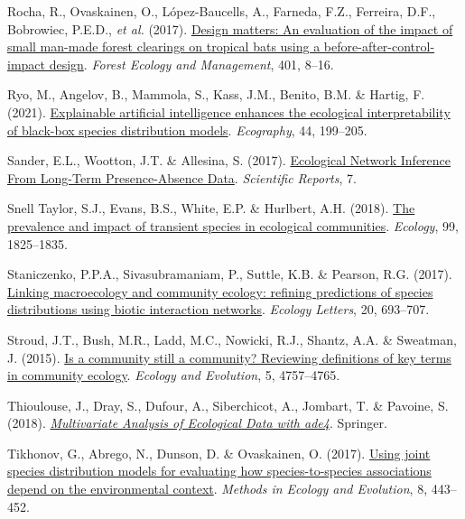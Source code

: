 \documentclass[9pt,biorxiv,doublespacing,lineno,endfloat]{lapreprint}
\newlength{\cslhangindent}
\newlength{\cslentryspacingunit} %
\newenvironment{CSLReferences}[2] %
 {%
  \setlength{\parindent}{0pt}
  \ifodd #1
  \let\oldpar\par
  \def\par{\hangindent=\cslhangindent\oldpar}
  \fi
  \setlength{\parskip}{#2\cslentryspacingunit}
 }%
 {}
\begin{document}
\begin{CSLReferences}{1}{0}
\leavevmode{}%
Rocha, R., Ovaskainen, O., López-Baucells, A., Farneda, F.Z., Ferreira,
D.F., Bobrowiec, P.E.D., \emph{et al.} (2017).
\href{https://doi.org/10.1016/j.foreco.2017.06.053}{Design matters: An
evaluation of the impact of small man-made forest clearings on tropical
bats using a before-after-control-impact design}. \emph{Forest Ecology
and Management}, 401, 8--16.

\leavevmode{}%
Ryo, M., Angelov, B., Mammola, S., Kass, J.M., Benito, B.M. \& Hartig,
F. (2021). \href{https://doi.org/10.1111/ecog.05360}{Explainable
artificial intelligence enhances the ecological interpretability of
black-box species distribution models}. \emph{Ecography}, 44, 199--205.

\leavevmode{}%
Sander, E.L., Wootton, J.T. \& Allesina, S. (2017).
\href{https://doi.org/10.1038/s41598-017-07009-x}{Ecological Network
Inference From Long-Term Presence-Absence Data}. \emph{Scientific
Reports}, 7.

\leavevmode{}%
Snell Taylor, S.J., Evans, B.S., White, E.P. \& Hurlbert, A.H. (2018).
\href{https://doi.org/10.1002/ecy.2398}{The prevalence and impact of
transient species in ecological communities}. \emph{Ecology}, 99,
1825--1835.

\leavevmode{}%
Staniczenko, P.P.A., Sivasubramaniam, P., Suttle, K.B. \& Pearson, R.G.
(2017). \href{https://doi.org/10.1111/ele.12770}{Linking macroecology
and community ecology: refining predictions of species distributions
using biotic interaction networks}. \emph{Ecology Letters}, 20,
693--707.

\leavevmode{}%
Stroud, J.T., Bush, M.R., Ladd, M.C., Nowicki, R.J., Shantz, A.A. \&
Sweatman, J. (2015). \href{https://doi.org/10.1002/ece3.1651}{Is a
community still a community? Reviewing definitions of key terms in
community ecology}. \emph{Ecology and Evolution}, 5, 4757--4765.

\leavevmode{}%
Thioulouse, J., Dray, S., Dufour, A., Siberchicot, A., Jombart, T. \&
Pavoine, S. (2018).
\emph{\href{https://doi.org/10.1007/978-1-4939-8850-1}{Multivariate
Analysis of Ecological Data with ade4}}. Springer.

\leavevmode{}%
Tikhonov, G., Abrego, N., Dunson, D. \& Ovaskainen, O. (2017).
\href{https://doi.org/10.1111/2041-210X.12723}{Using joint species
distribution models for evaluating how species-to-species associations
depend on the environmental context}. \emph{Methods in Ecology and
Evolution}, 8, 443--452.


\end{CSLReferences}
\end{document}
